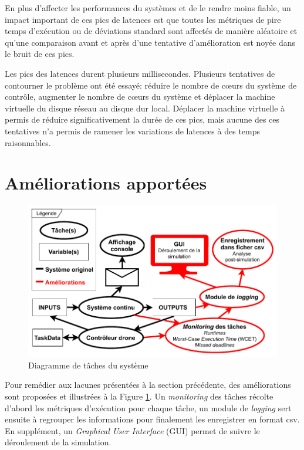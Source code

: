 \documentclass[journal]{IEEEtran}
\begin{document}
En plus d'affecter les performances du systèmes et de le rendre moins fiable, un impact important de ces pics de latences est que toutes les métriques de pire temps d'exécution ou de déviations standard sont affectés de manière aléatoire et qu'une comparaison avant et après d'une tentative d'amélioration est noyée dans le bruit de ces pics.

Les pics des latences durent plusieurs millisecondes. Plusieurs tentatives de contourner le problème ont été essayé: réduire le nombre de cœurs du système de contrôle, augmenter le nombre de cœurs du système et déplacer la machine virtuelle du disque réseau au disque dur local. Déplacer la machine virtuelle à permis de réduire significativement la durée de ces pics, mais aucune des ces tentatives n'a permis de ramener les variations de latences à des temps raisonnables.

\section{Améliorations apportées}
\label{ameliorations}

\begin{figure}
	\centering
	\captionsetup{justification=centering}
	\includegraphics[width=\linewidth]{diagrammeDeTaches_Simple.pdf}
	\caption{Diagramme de tâches du système}
	\label{taskDiagram}
\end{figure}

Pour remédier aux lacunes présentées à la section précédente, des améliorations sont proposées et illustrées à la Figure \ref{taskDiagram}. Un \textit{monitoring} des tâches récolte d'abord les métriques d'exécution pour chaque tâche, un module de \textit{logging} sert ensuite à regrouper les informations pour finalement les enregistrer en format csv. En supplément, un \textit{Graphical User Interface} (GUI) permet de suivre le déroulement de la simulation.
\end{document}
